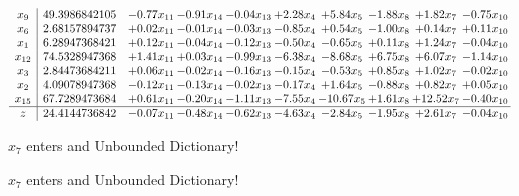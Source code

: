 \documentclass[9pt]{article}
\begin{document}
 \[\begin{array}{c| c c@{\hskip 2pt} c@{\hskip 2pt} c@{\hskip 2pt} c@{\hskip 2pt} c@{\hskip 2pt} c@{\hskip 2pt} c@{\hskip 2pt} c@{\hskip 2pt} }
 x_{9}   &  49.3986842105 & -0.77 x_{11} & -0.91 x_{14} & -0.04 x_{13} & +  2.28 x_{4} & +  5.84 x_{5} & -1.88 x_{8} & +  1.82 x_{7} & -0.75 x_{10}\\
 x_{6}   &  2.68157894737 & +  0.02 x_{11} & -0.01 x_{14} & -0.03 x_{13} & -0.85 x_{4} & +  0.54 x_{5} & -1.00 x_{8} & +  0.14 x_{7} & +  0.11 x_{10}\\
 x_{1}   &  6.28947368421 & +  0.12 x_{11} & -0.04 x_{14} & -0.12 x_{13} & -0.50 x_{4} & -0.65 x_{5} & +  0.11 x_{8} & +  1.24 x_{7} & -0.04 x_{10}\\
 x_{12}   &  74.5328947368 & +  1.41 x_{11} & +  0.03 x_{14} & -0.99 x_{13} & -6.38 x_{4} & -8.68 x_{5} & +  6.75 x_{8} & +  6.07 x_{7} & -1.14 x_{10}\\
 x_{3}   &  2.84473684211 & +  0.06 x_{11} & -0.02 x_{14} & -0.16 x_{13} & -0.15 x_{4} & -0.53 x_{5} & +  0.85 x_{8} & +  1.02 x_{7} & -0.02 x_{10}\\
 x_{2}   &  4.09078947368 & -0.12 x_{11} & -0.13 x_{14} & -0.02 x_{13} & -0.17 x_{4} & +  1.64 x_{5} & -0.88 x_{8} & +  0.82 x_{7} & +  0.05 x_{10}\\
 x_{15}   &  67.7289473684 & +  0.61 x_{11} & -0.20 x_{14} & -1.11 x_{13} & -7.55 x_{4} & -10.67 x_{5} & +  1.61 x_{8} & + 12.52 x_{7} & -0.40 x_{10}\\
\hline
z    &  24.4144736842 & -0.07 x_{11} & -0.48 x_{14} & -0.62 x_{13} & -4.63 x_{4} & -2.84 x_{5} & -1.95 x_{8} & +  2.61 x_{7} & -0.04 x_{10}\\
\end{array}\]


 $ x_{7} $ enters and Unbounded Dictionary!


 $ x_{7} $ enters and Unbounded Dictionary!
\end{document}
